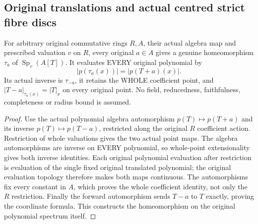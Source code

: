 \subsection{Original translations and actual centred strict fibre discs}
\begin{lemma}
\label{analytic:actual-polynomial-translation-homeomorphisms}
\leanok
{}
For arbitrary original commutative rings $R,A$, their actual algebra map and
prescribed valuation $v$ on $R$, every original $a\in A$ gives a genuine
homeomorphism $\tau_a$ of $\operatorname{Sp}_v(A[T])$. It evaluates EVERY
original polynomial by
\[
 |p(\tau_a(x))|=|p(T+a)(x)|.
\]
Its actual inverse is $\tau_{-a}$, it retains the WHOLE coefficient point,
and $|T-a|_{\tau_a(x)}=|T|_x$ on every original point. No field, reducedness,
faithfulness, completeness or radius bound is assumed.
\end{lemma}
\begin{proof}
Use the actual polynomial algebra automorphism $p(T)\mapsto p(T+a)$ and its
inverse $p(T)\mapsto p(T-a)$, restricted along the original $R$ coefficient
action. Restriction of whole valuations gives the two actual point maps.
The algebra automorphisms are inverse on EVERY polynomial, so whole-point
extensionality gives both inverse identities. Each original polynomial
evaluation after restriction is evaluation of the single fixed original
translated polynomial; the original evaluation topology therefore makes
both maps continuous. The automorphisms fix every constant in $A$, which
proves the whole coefficient identity, not only the $R$ restriction.
Finally the forward automorphism sends $T-a$ to $T$ exactly, proving the
coordinate formula. This constructs the homeomorphism on the original
polynomial spectrum itself.
\end{proof}

